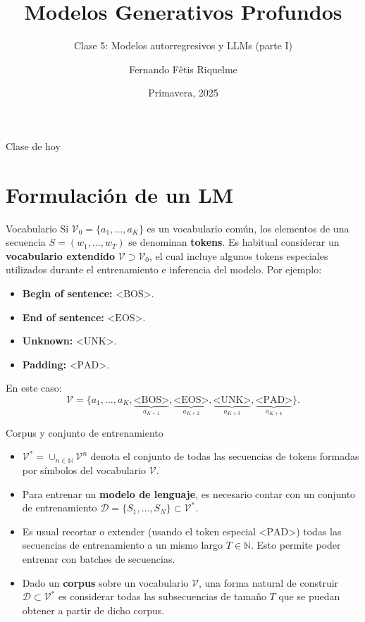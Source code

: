 \documentclass{beamer}
\title{Modelos Generativos Profundos}
\subtitle{Clase 5: Modelos autorregresivos y LLMs (parte I)}
\author{Fernando Fêtis Riquelme}
\institute{
    Facultad de Ciencias Físicas y Matemáticas\\
    Universidad de Chile
}
\date{Primavera, 2025}
\newcommand{\N}{\mathbb{N}}
\begin{document}
\begin{frame}
    \titlepage
\end{frame}

\begin{frame}{Clase de hoy}
    \tableofcontents
\end{frame}

\section{Formulación de un LM}

\begin{frame}{Vocabulario}
    Si $\mathcal{V}_0=\{a_1,\ldots,a_K\}$ es un vocabulario común, los elementos de una secuencia $S=(w_1,\ldots,w_T)$ se denominan \textbf{tokens}.
    Es habitual considerar un \textbf{vocabulario extendido} $\mathcal{V}\supset\mathcal{V}_0$, el cual incluye algunos tokens especiales utilizados durante el entrenamiento e inferencia del modelo. Por ejemplo:
    \begin{itemize}
        \item \textbf{Begin of sentence:} $\text{<BOS>}$.
        \item \textbf{End of sentence:} $\text{<EOS>}$.
        \item \textbf{Unknown:} $\text{<UNK>}$.
        \item \textbf{Padding:} $\text{<PAD>}$.
    \end{itemize}
    En este caso:
    \begin{equation*}
        \mathcal{V}=\{a_1,\ldots,a_K,\underbrace{\text{<BOS>}}_{a_{K+1}},\underbrace{\text{<EOS>}}_{a_{K+2}},\underbrace{\text{<UNK>}}_{a_{K+3}},\underbrace{\text{<PAD>}}_{a_{K+4}}\}.
    \end{equation*}
\end{frame}

\begin{frame}{Corpus y conjunto de entrenamiento}
    \begin{itemize}
        \item $\mathcal{V}^*=\cup_{n\in\N} \mathcal{V}^n$ denota el conjunto de todas las secuencias de tokens formadas por símbolos del vocabulario $\mathcal{V}$.
        \item Para entrenar un \textbf{modelo de lenguaje}, es necesario contar con un conjunto de entrenamiento $\mathcal{D}=\{S_1,\ldots,S_N\}\subset \mathcal{V}^*$.
        \item Es usual recortar o extender (usando el token especial $\text{<PAD>}$) todas las secuencias de entrenamiento a un mismo largo $T\in\N$. Esto permite poder entrenar con batches de secuencias.
        \item Dado un \textbf{corpus} sobre un vocabulario $\mathcal{V}$, una forma natural de construir $\mathcal{D}\subset\mathcal{V}^*$ es considerar todas las subsecuencias de tamaño $T$ que se puedan obtener a partir de dicho corpus.
    \end{itemize}
\end{frame}
\end{document}
